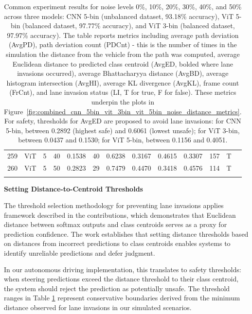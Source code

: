 \begin{longtable}{@{}cllrrrrrrrrrc@{}}
259 & ViT & 5 & 40 & 0.1538 & 40 & 0.6238 & 0.3167 & 0.4615 & 0.3307 & 157 & T \\
260 & ViT & 5 & 50 & 0.2823 & 29 & 0.7479 & 0.4470 & 0.3418 & 0.4576 & 114 & T \\
\bottomrule
\caption{Common experiment results for noise levels 0\%, 10\%, 20\%, 30\%, 40\%, and 50\% across three models: CNN 5-bin (unbalanced dataset, 93.18\% accuracy), ViT 5-bin (balanced dataset, 97.77\% accuracy), and ViT 3-bin (balanced dataset, 97.97\% accuracy). The table reports metrics including average path deviation (AvgPD), path deviation count (PDCnt) - this is the number of times in the simulation the distance from the vehicle from the path was computed, average Euclidean distance to predicted class centroid (AvgED, bolded where lane invasions occurred), average Bhattacharyya distance (AvgBD), average histogram intersection (AvgHI), average KL divergence (AvgKL), frame count (FrCnt), and lane invasion status (LI, T for true, F for false). These metrics underpin the plots in Figure~\ref{fig:combined_cnn_5bin_vit_3bin_vit_5bin_noise_distance_metrics}. For safety, thresholds for AvgED are proposed to avoid lane invasions: for CNN 5-bin, between 0.2892 (highest safe) and 0.6061 (lowest unsafe); for ViT 3-bin, between 0.0437 and 0.1530; for ViT 5-bin, between 0.1156 and 0.4051.}
\label{tab:experiment_stats_common_0_10_20_30_40_50}
\end{longtable}


\textbf{Setting Distance-to-Centroid Thresholds}

The threshold selection methodology for preventing lane invasions applies framework described in the contributions, which demonstrates that Euclidean distance between softmax outputs and class centroids serves as a proxy for prediction confidence. The work establishes that setting distance thresholds based on distances from incorrect predictions to class centroids enables systems to identify unreliable predictions and defer judgment.

In our autonomous driving implementation, this translates to safety thresholds: when steering predictions exceed the distance threshold to their class centroid, the system should reject the prediction as potentially unsafe. The threshold ranges in Table \ref{tab:experiment_stats_common_0_10_20_30_40_50} represent conservative boundaries derived from the minimum distance observed for lane invasions in our simulated scenarios. 

